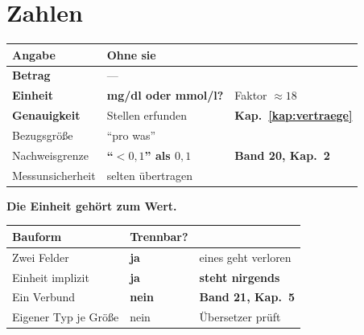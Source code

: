 \chapter{Zahlen}\label{kap:zahlen}

\begin{merksatz}
\begin{center}
{\small
\renewcommand{\arraystretch}{1.5}
\begin{tabular}{@{}P{2.8cm}P{2.6cm}P{2.6cm}@{}}
\toprule
\textbf{Angabe} & \textbf{Ohne sie} & \\
\midrule
\textbf{Betrag} & --- & \\
\textbf{Einheit} & \textcolor{akzent}{\textbf{mg/dl oder mmol/l?}} & \textcolor{akzent}{Faktor $\approx18$}\\
\textbf{Genauigkeit} & \textcolor{akzent}{Stellen erfunden} & \textbf{Kap.~\ref{kap:vertraege}}\\
Bezugsgröße & \textcolor{akzent}{\enquote{pro was}} & \\
Nachweisgrenze & \textcolor{akzent}{\textbf{\enquote{$<0{,}1$} als $0{,}1$}} & \textcolor{akzent}{\textbf{Band 20, Kap.~2}}\\
Messunsicherheit & \textcolor{mittel}{selten übertragen} & \\
\bottomrule
\end{tabular}}
\end{center}

\begin{center}
\begin{minipage}{0.88\textwidth}
\end{minipage}
\end{center}

\textbf{Die Einheit gehört zum Wert.}

\begin{center}
\renewcommand{\arraystretch}{1.5}
\begin{tabular}{@{}P{2.8cm}P{2.4cm}P{2.8cm}@{}}
\toprule
\textbf{Bauform} & \textbf{Trennbar?} & \\
\midrule
Zwei Felder & \textcolor{akzent}{\textbf{ja}} & \textcolor{akzent}{eines geht verloren}\\
Einheit implizit & \textcolor{akzent}{\textbf{ja}} & \textcolor{akzent}{\textbf{steht nirgends}}\\
Ein Verbund & \textcolor{gruen}{\textbf{nein}} & \textcolor{gruen}{\textbf{Band 21, Kap.~5}}\\
Eigener Typ je Größe & \textcolor{gruen}{nein} & \textcolor{gruen}{Übersetzer prüft}\\
\bottomrule
\end{tabular}
\end{center}


\end{merksatz}
